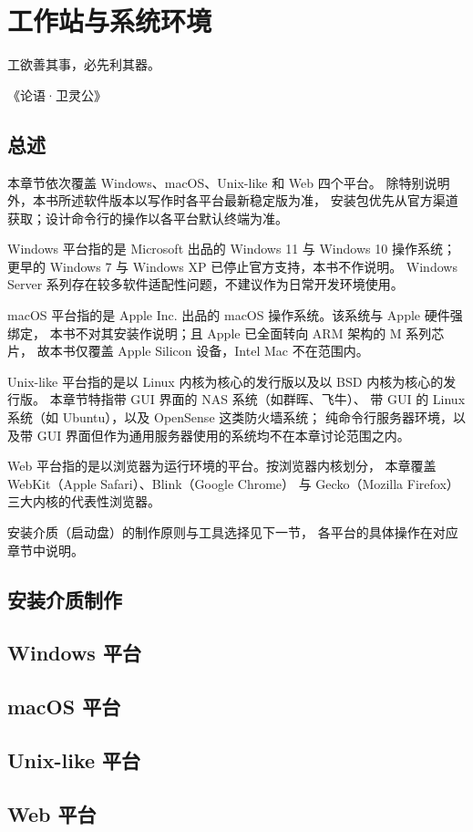 \chapter{工作站与系统环境}

\epigraph{工欲善其事，必先利其器。}{《论语·卫灵公》}

\section{总述}

本章节依次覆盖 Windows、macOS、Unix-like 和 Web 四个平台。
除特别说明外，本书所述软件版本以写作时各平台最新稳定版为准，
安装包优先从官方渠道获取；设计命令行的操作以各平台默认终端为准。

Windows 平台指的是 Microsoft 出品的 Windows 11 与 Windows 10 操作系统；
更早的 Windows 7 与 Windows XP 已停止官方支持，本书不作说明。
Windows Server 系列存在较多软件适配性问题，不建议作为日常开发环境使用。

macOS 平台指的是 Apple Inc. 出品的 macOS 操作系统。该系统与 Apple 硬件强绑定，
本书不对其安装作说明；且 Apple 已全面转向 ARM 架构的 M 系列芯片，
故本书仅覆盖 Apple Silicon 设备，Intel Mac 不在范围内。

Unix-like 平台指的是以 Linux 内核为核心的发行版以及以 BSD 内核为核心的发行版。
本章节特指带 GUI 界面的 NAS 系统（如群晖、飞牛）、
带 GUI 的 Linux 系统（如 Ubuntu），以及 OpenSense 这类防火墙系统；
纯命令行服务器环境，以及带 GUI 界面但作为通用服务器使用的系统均不在本章讨论范围之内。

Web 平台指的是以浏览器为运行环境的平台。按浏览器内核划分，
本章覆盖 WebKit（Apple Safari）、Blink（Google Chrome）
与 Gecko（Mozilla Firefox）三大内核的代表性浏览器。

安装介质（启动盘）的制作原则与工具选择见下一节，
各平台的具体操作在对应章节中说明。

\section{安装介质制作}



\section{Windows 平台}



\section{macOS 平台}

\section{Unix-like 平台}

\section{Web 平台}